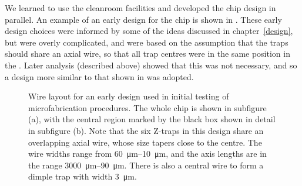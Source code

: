 We learned to use the cleanroom facilities and developed the chip design in
parallel. An example of an early design for the chip is shown in
. These early design choices were informed by
some of the ideas discussed in chapter~\ref{design}, but were overly
complicated, and were based on the assumption that the traps should share an
axial wire, so that all trap centres were in the same position in the
\xyplane{}. Later analysis (described above) showed that this was not
necessary, and so a design more similar to that shown in
 was adopted.

\begin{figure}[ht]
  \begin{subfigure}[b]{0.45\textwidth}
    \centering
    \caption{}
  \end{subfigure}
  \hspace{1cm}
  \begin{subfigure}[b]{0.45\textwidth}
    \centering
    \caption{}
  \end{subfigure}
  \caption{Wire layout for an early design used in initial testing of
  microfabrication procedures. The whole chip is shown in subfigure (a), with
  the central region marked by the black box shown in detail in subfigure (b).
  Note that the six Z-traps in this design share an overlapping axial wire,
  whose size tapers close to the centre. The wire widths range from
  \SIrange{60}{10}{\micro\meter}, and the axis lengths are in the range
  \SIrange{3000}{90}{\micro\meter}. There is also a central wire to form a
  dimple trap with width \SI{3}{\micro\meter}.
  }
  \label{fab:figs:earlydesign}
\end{figure}

